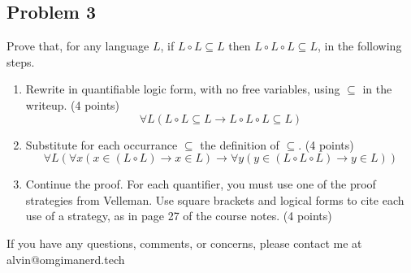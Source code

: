 \documentclass[letterpaper, 12pt]{math}
\begin{document}
\subsection*{Problem 3}
Prove that, for any language \( L \), if \( L\circ L \subseteq L \) then
\( L \circ L \circ L \subseteq L \), in the following steps.
\begin{enumerate}
  \item Rewrite in quantifiable logic form, with no free variables, using
    \( \subseteq \) in the writeup. (4 points)
    \[ \forall{L}(L\circ L\subseteq L \to L\circ L\circ L\subseteq L) \]
  \item Substitute for each occurrance \( \subseteq \) the definition of
    \( \subseteq \). (4 points)
    \[ \forall{L}(\forall{x}(x\in(L\circ L)\to x\in L)\to
      \forall{y}(y\in(L\circ L\circ L)\to y\in L)) \]
  \item Continue the proof. For each quantifier, you must use one of the proof
    strategies from Velleman. Use square brackets and logical forms to cite
    each use of a strategy, as in page 27 of the course notes. (4 points)
\end{enumerate}

\begin{center}
  If you have any questions, comments, or concerns, please contact me at
  alvin@omgimanerd.tech
\end{center}
\end{document}
